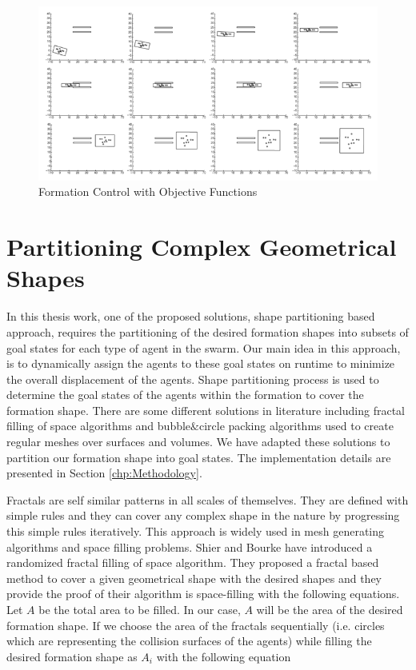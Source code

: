 \begin{figure}[H]
	\caption{Formation Control with Objective Functions \cite{25}} \label{kumar_belta}
	\centering
	\includegraphics[scale = 0.8]{manifold}
\end{figure}



\section{Partitioning Complex Geometrical Shapes}

In this thesis work, one of the proposed solutions, shape partitioning based approach,  requires the partitioning of the desired formation shapes into subsets of goal states for each type of agent in the swarm. Our main idea in this approach, is to dynamically assign the agents to these goal states on runtime to minimize the overall displacement of the agents. Shape partitioning process is used to determine the goal states of the agents within the formation to cover the formation shape. There are some different solutions in literature including fractal filling of space algorithms and bubble$\&$circle packing algorithms used to create regular meshes over surfaces and volumes. We have adapted these solutions to partition our formation shape into goal states. The implementation details are presented in Section \ref{chp:Methodology}.

Fractals are self similar  patterns in all scales of themselves. They are defined with simple rules and they can cover any complex shape in the nature by progressing this simple rules iteratively. This approach is widely used in mesh generating algorithms and space filling problems.  Shier and Bourke \cite{26} have introduced a randomized fractal filling of space algorithm. They proposed a fractal based method to cover a given geometrical shape with the desired shapes and they provide the proof of their algorithm is space-filling with the following equations. Let $A$ be the total area to be filled. In our case, $A$ will be the area of the desired formation shape. If we choose the area of the fractals sequentially (i.e. circles which are representing the collision surfaces of the agents)  while filling the desired formation shape as $A_i$ with the following equation

